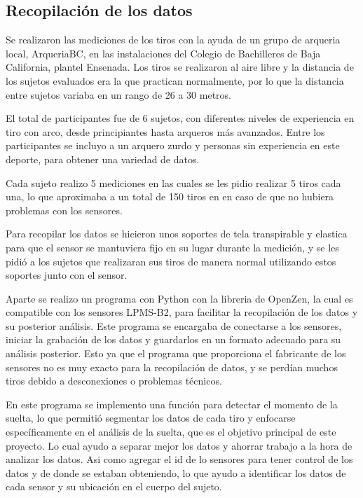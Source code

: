 \documentclass[11pt,a4paper,twocolumn,twoside]{rho-class/rho}
\begin{document}
        

    \subsection{Recopilación de los datos}

        Se realizaron las mediciones de los tiros con la ayuda de un grupo de arqueria local, ArqueriaBC, en las instalaciones del Colegio de Bachilleres de Baja California, plantel Ensenada. Los tiros se realizaron al aire libre y la distancia de los sujetos evaluados era la que practican normalmente, por lo que la distancia entre sujetos variaba en un rango de 26 a 30 metros.

        El total de participantes fue de 6 sujetos, con diferentes niveles de experiencia en tiro con arco, desde principiantes hasta arqueros más avanzados. Entre los participantes se incluyo a un arquero zurdo y personas sin experiencia en este deporte, para obtener una variedad de datos.

        Cada sujeto realizo 5 mediciones en las cuales se les pidio realizar 5 tiros cada una, lo que aproximaba a un total de 150 tiros en en caso de que no hubiera problemas con los sensores.

        Para recopilar los datos se hicieron unos soportes de tela transpirable y elastica para que el sensor se mantuviera fijo en su lugar durante la medición, y se les pidió a los sujetos que realizaran sus tiros de manera normal utilizando estos soportes junto con el sensor.

        Aparte se realizo un programa con Python con la libreria de OpenZen, la cual es compatible con los sensores LPMS-B2, para facilitar la recopilación de los datos y su posterior análisis. Este programa se encargaba de conectarse a los sensores, iniciar la grabación de los datos y guardarlos en un formato adecuado para su análisis posterior. Esto ya que el programa que proporciona el fabricante de los sensores no es muy exacto para la recopilación de datos, y se perdían muchos tiros debido a desconexiones o problemas técnicos.

        En este programa se implemento una función para detectar el momento de la suelta, lo que permitió segmentar los datos de cada tiro y enfocarse específicamente en el análisis de la suelta, que es el objetivo principal de este proyecto. Lo cual ayudo a separar mejor los datos y ahorrar trabajo a la hora de analizar los datos. Asi como agregar el id de lo sensores para tener control de los datos y de donde se estaban obteniendo, lo que ayudo a identificar los datos de cada sensor y su ubicación en el cuerpo del sujeto.
\end{document}
